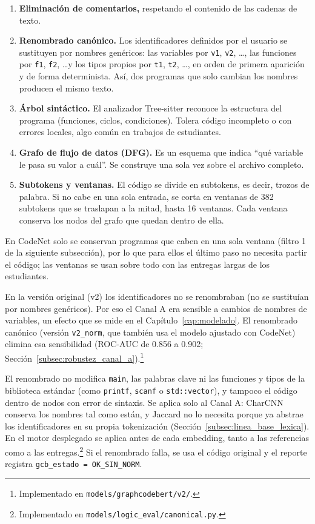 \begin{enumerate}
    \item \textbf{Eliminación de comentarios,} respetando el contenido de las cadenas de texto.
    \item \textbf{Renombrado canónico.} Los identificadores definidos por el usuario se sustituyen por nombres genéricos: las variables por \texttt{v1}, \texttt{v2}, \ldots, las funciones por \texttt{f1}, \texttt{f2}, \ldots y los tipos propios por \texttt{t1}, \texttt{t2}, \ldots, en orden de primera aparición y de forma determinista. Así, dos programas que solo cambian los nombres producen el mismo texto.
    \item \textbf{Árbol sintáctico.} El analizador Tree-sitter \cite{Brunsfeld2021Treesitter} reconoce la estructura del programa (funciones, ciclos, condiciones). Tolera código incompleto o con errores locales, algo común en trabajos de estudiantes.
    \item \textbf{Grafo de flujo de datos (DFG).} Es un esquema que indica ``qué variable le pasa su valor a cuál''. Se construye una sola vez sobre el archivo completo.
    \item \textbf{Subtokens y ventanas.} El código se divide en subtokens, es decir, trozos de palabra. Si no cabe en una sola entrada, se corta en ventanas de 382 subtokens que se traslapan a la mitad, hasta 16 ventanas. Cada ventana conserva los nodos del grafo que quedan dentro de ella.
\end{enumerate}

En CodeNet solo se conservan programas que caben en una sola ventana (filtro 1 de la siguiente subsección), por lo que para ellos el último paso no necesita partir el código; las ventanas se usan sobre todo con las entregas largas de los estudiantes.

En la versión original (v2) los identificadores no se renombraban (no se sustituían por nombres genéricos). Por eso el Canal A era sensible a cambios de nombres de variables, un efecto que se mide en el Capítulo~\ref{cap:modelado}. El renombrado canónico (versión \texttt{v2\_norm}, que también usa el modelo ajustado con CodeNet) elimina esa sensibilidad (ROC-AUC de 0.856 a 0.902; Sección~\ref{subsec:robustez_canal_a}).\footnote{Implementado en \texttt{models/graphcodebert/v2/}.}

El renombrado no modifica \texttt{main}, las palabras clave ni las funciones y tipos de la biblioteca estándar (como \texttt{printf}, \texttt{scanf} o \texttt{std::vector}), y tampoco el código dentro de nodos con error de sintaxis. Se aplica solo al Canal A: CharCNN conserva los nombres tal como están, y Jaccard no lo necesita porque ya abstrae los identificadores en su propia tokenización (Sección~\ref{subsec:linea_base_lexica}). En el motor desplegado se aplica antes de cada embedding, tanto a las referencias como a las entregas.\footnote{Implementado en \texttt{models/logic\_eval/canonical.py}.} Si el renombrado falla, se usa el código original y el reporte registra \texttt{gcb\_estado = OK\_SIN\_NORM}.

